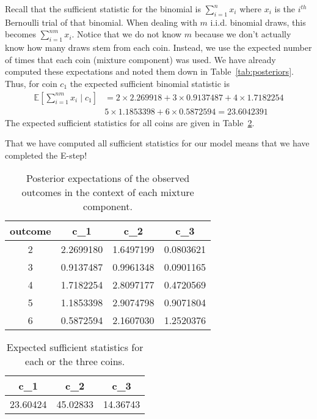 \documentclass[a4paper,11pt,leqno]{report}\usepackage[]{graphicx}\usepackage[]{color}
\newcommand{\E}{\mathbb{E}}
\begin{document}
Recall that the sufficient statistic for the binomial is 
$ \sum_{i=1}^{n} x_{i} $ where $ x_{i} $ is the $ i^{th} $ Bernoulli trial of that binomial. 
When dealing with $ m $ i.i.d. binomial draws, this becomes $ \sum_{i=1}^{nm} x_{i} $. Notice that we do not
know $ m $ because we don't actually know how many draws stem from each coin. Instead, we use the expected number of times
that each coin (mixture component) was used. We have already computed these expectations and noted them down in Table~\ref{tab:posteriors}. Thus, for coin $ c_{1} $
the expected sufficient binomial statistic is
\begin{align}
\E\left[\sum_{i=1}^{nm} x_{i}\mid c_{1}\right] &= 2 \times 2.269918 + 3 \times 0.9137487 + 4 \times 1.7182254  \\
&5 \times 1.1853398 + 6 \times 0.5872594 = 23.6042391 \nonumber
\end{align}
The expected sufficient statistics for all coins are given in Table~\ref{tab:binomPosteriors}.

That we have computed all sufficient statistics
for our model means that we have completed the E-step!

\begin{table}
\center

\begin{tabular}{c|c|c|c}
\hline
outcome & c\_1 & c\_2 & c\_3\\
\hline
2 & 2.2699180 & 1.6497199 & 0.0803621\\
\hline
3 & 0.9137487 & 0.9961348 & 0.0901165\\
\hline
4 & 1.7182254 & 2.8097177 & 0.4720569\\
\hline
5 & 1.1853398 & 2.9074798 & 0.9071804\\
\hline
6 & 0.5872594 & 2.1607030 & 1.2520376\\
\hline
\end{tabular}


\caption{Posterior expectations of the observed outcomes in the context of each mixture component.}
\label{tab:binomCounts}
\end{table}

\begin{table}
\center 

\begin{tabular}{c|c|c}
\hline
c\_1 & c\_2 & c\_3\\
\hline
23.60424 & 45.02833 & 14.36743\\
\hline
\end{tabular}


\caption{Expected sufficient statistics for each or the three coins.}
\label{tab:binomPosteriors}
\end{table}
\end{document}
